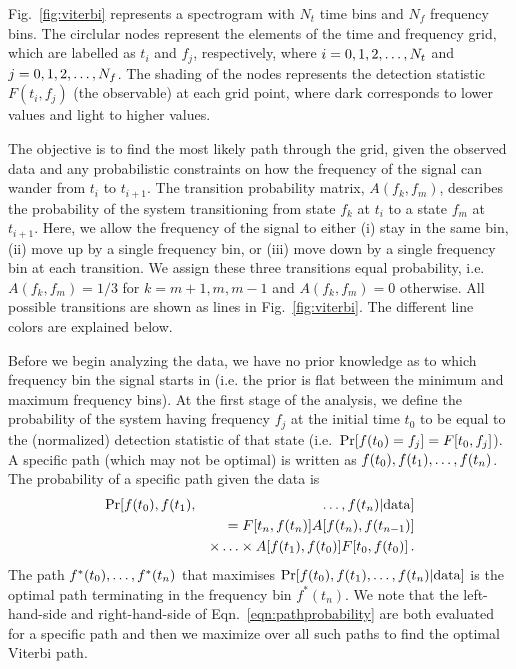 \documentclass[paper-main.tex]{subfiles}
\begin{document}
Fig.~\ref{fig:viterbi} represents a spectrogram with $N_t$ time bins and $N_f$ frequency bins.
The circlular nodes represent the elements of the time and frequency grid, which are labelled as  
$t_i$ and $f_j$, respectively, where $i=0,1,2,\mathellipsis,N_t$ and $j=0,1,2,\mathellipsis,N_f$. 
The shading of the nodes represents the detection statistic $F(t_i,f_j)$ (the observable) at each grid point, where dark corresponds to lower values and light to higher values. 


The objective is to find the most likely path through the grid, given the observed data and any probabilistic constraints on how the frequency of the signal can wander from $t_i$ to $t_{i+1}$. 
The transition probability matrix, $A(f_k,f_m)$, describes the probability of the system transitioning from state $f_k$ at $t_i$ to a state $f_{m}$ at $t_{i+1}$. 
Here, we allow the frequency of the signal to either (i) stay in the same bin, (ii) move up by a single frequency bin, or (iii) move down by a single frequency bin at each transition. 
We assign these three transitions equal probability, i.e.\ $A(f_k,f_m)=1/3$ for $k=m+1,m,m-1$ and $A(f_k,f_m)=0$ otherwise.
All possible transitions are shown as lines in Fig.~\ref{fig:viterbi}.
The different line colors are explained below. 





Before we begin analyzing the data, we have no prior knowledge as to which frequency bin the signal starts in (i.e. the prior is flat between the minimum and maximum frequency bins).
At the first stage of the analysis, we define the probability of the system having frequency $f_j$ at the initial time $t_0$ to be equal to the (normalized) detection statistic of that state (i.e.\  ${\rm Pr}[f(t_0) = f_j] = F[t_0,f_j]$).
A specific path (which may not be optimal) is written as $f(t_0), f(t_1),\mathellipsis, f(t_n)$. 
The probability of a specific path given the data is 
\begin{eqnarray}
{\rm Pr}[ f(t_0), f(t_1),&&\mathellipsis, f(t_n) | {\rm data}] \nonumber\\
          && =F[t_n,f(t_n)] A[f(t_n),f(t_{n-1})] \nonumber \\
          && \times\mathellipsis\times A[f(t_1),f(t_0)] F[t_0,f(t_0)] \,.
\label{eqn:pathprobability}
\end{eqnarray}
The path $f^\ast(t_0),\mathellipsis,f^\ast(t_n)$ that maximises ${\rm Pr}[ f(t_0), f(t_1),\mathellipsis, f(t_n) | {\rm data}]$ is the optimal path terminating in the frequency bin $f^\ast(t_n)$. 
We note that the left-hand-side and right-hand-side of Eqn.~\ref{eqn:pathprobability} are both evaluated for a specific path and then we maximize over all such paths to find the optimal Viterbi path. 
\end{document}
